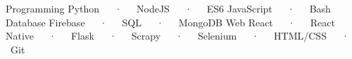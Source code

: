

\begin{cvtechnicals}
  \cvtechnical %
    {Programming} %
    {Python~~~·~~~NodeJS~~~·~~~ES6 JavaScript~~~·~~~Bash} %
    {Database} %
    {Firebase~~~·~~~SQL~~~·~~~MongoDB} %
    {Web} %
    {React~~~·~~~React Native~~~·~~~Flask~~~·~~~Scrapy~~~·~~~Selenium~~~·~~~HTML/CSS~~~·~~~Git} %
\end{cvtechnicals}